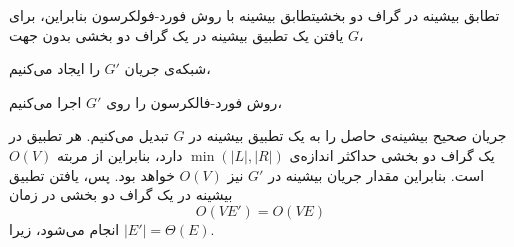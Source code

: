 \begin{itemframe-s}{تطابق بیشینه در گراف دو بخشی}{تطابق بیشینه با روش فورد-فولکرسون}
\itm
بنابراین، برای یافتن یک تطبیق بیشینه در یک گراف دو بخشی بدون جهت $G$،
\item[1]
 شبکه‌ی جریان $G'$ را ایجاد می‌کنیم،
\item[2]
روش فورد-فالکرسون را روی $G'$ اجرا می‌کنیم،
\item[3]
 جریان صحیح بیشینه‌ی حاصل را به یک تطبیق بیشینه در $G$ تبدیل می‌کنیم.
\itm
هر تطبیق در یک گراف دو بخشی حداکثر اندازه‌ی
 $\min({|L|, |R|}) $
دارد، بنابراین از مربته
$O(V)$
است.
بنابراین مقدار جریان بیشینه در $G'$ نیز $O(V)$ خواهد بود. پس، یافتن تطبیق بیشینه در یک گراف دو بخشی در زمان
$$O(VE') = O(VE)$$
انجام می‌شود، زیرا
 $|E'| = \Theta(E)$.
\end{itemframe-s}